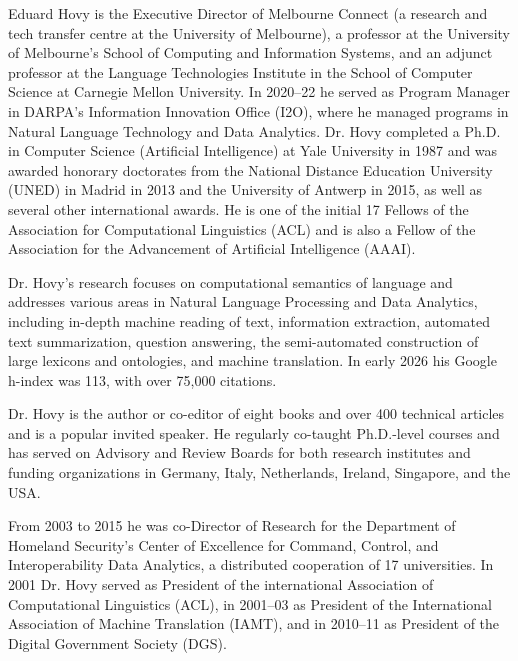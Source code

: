 Eduard Hovy is the Executive Director of Melbourne Connect (a research and tech transfer centre at the University of Melbourne), a professor at the University of Melbourne’s School of Computing and Information Systems, and an adjunct professor at the Language Technologies Institute in the School of Computer Science at Carnegie Mellon University. In 2020–22 he served as Program Manager in DARPA’s Information Innovation Office (I2O), where he managed programs in Natural Language Technology and Data Analytics. Dr. Hovy completed a Ph.D. in Computer Science (Artificial Intelligence) at Yale University in 1987 and was awarded honorary doctorates from the National Distance Education University (UNED) in Madrid in 2013 and the University of Antwerp in 2015, as well as several other international awards. He is one of the initial 17 Fellows of the Association for Computational Linguistics (ACL) and is also a Fellow of the Association for the Advancement of Artificial Intelligence (AAAI).

Dr. Hovy’s research focuses on computational semantics of language and addresses various areas in Natural Language Processing and Data Analytics, including in-depth machine reading of text, information extraction, automated text summarization, question answering, the semi-automated construction of large lexicons and ontologies, and machine translation. In early 2026 his Google h-index was 113, with over 75,000 citations.

Dr. Hovy is the author or co-editor of eight books and over 400 technical articles and is a popular invited speaker. He regularly co-taught Ph.D.-level courses and has served on Advisory and Review Boards for both research institutes and funding organizations in Germany, Italy, Netherlands, Ireland, Singapore, and the USA.

From 2003 to 2015 he was co-Director of Research for the Department of Homeland Security’s Center of Excellence for Command, Control, and Interoperability Data Analytics, a distributed cooperation of 17 universities. In 2001 Dr. Hovy served as President of the international Association of Computational Linguistics (ACL), in 2001–03 as President of the International Association of Machine Translation (IAMT), and in 2010–11 as President of the Digital Government Society (DGS).